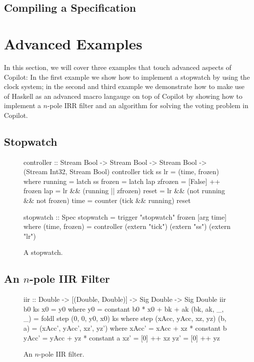 \documentclass[a4paper, 10pt]{article}
\newcommand{\todo}[1]{\textcolor{blue}{\fbox{TODO: #1}}}
\theoremstyle{example}
\begin{document}
\subsection{Compiling a Specification}

\section{Advanced Examples}

In this section, we will cover three examples that touch advanced aspects
of Copilot: In the first example we show how to implement a stopwatch by
using the clock system; in the second and third example we demonstrate how to make
use of Haskell as an advanced macro langauge on top of Copilot by showing how to
implement a $n$-pole IRR filter and an algorithm for solving the voting problem
in Copilot.


\subsection{Stopwatch}

\begin{figure}[ht!]
\begin{code}
controller
  :: Stream Bool
  -> Stream Bool
  -> Stream Bool
  -> (Stream Int32, Stream Bool)
controller tick ss lr = (time, frozen)
  where
    running    = latch ss
    frozen     = latch lap
    zfrozen    = [False] ++ frozen
    lap        = lr && (running || zfrozen)
    reset      = lr && (not running && not frozen)
    time       = counter (tick && running) reset

stopwatch :: Spec
stopwatch = trigger "stopwatch" frozen [arg time]
  where
    (time, frozen) = controller
      (extern "tick") (extern "ss") (extern "lr")
\end{code}
\caption{A stopwatch.}
\label{fig:stopwatch}
\end{figure}

\todo{T.B.D. when clocks work!}

\subsection{An $n$-pole IIR Filter}



\begin{figure}[ht!]
\begin{code}
iir :: Double -> [(Double, Double)] -> Sig Double -> Sig Double
iir b0 ks x0 = y0
  where
    y0 = constant b0 * x0 + bk + ak
    (bk, ak, _, _) = foldl step (0, 0, y0, x0) ks
      where
        step (xAcc, yAcc, xz, yz) (b, a) = (xAcc', yAcc', xz', yz')
          where
            xAcc' = xAcc + xz * constant b
            yAcc' = yAcc + yz * constant a
            xz'   = [0] ++ xz
            yz'   = [0] ++ yz
\end{code}
\caption{An $n$-pole IIR filter.}
\label{fig:n_pole_irr_filter}
\end{figure}
\end{document}
